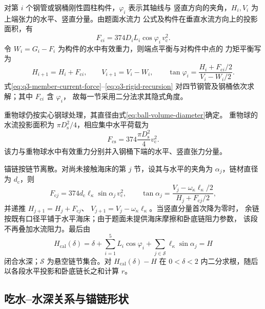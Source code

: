 对第 \(i\) 个钢管或钢桶刚性圆柱构件，\(\varphi_i\) 表示其轴线与
竖直方向的夹角，\(H_i,V_i\) 为上端张力的水平、竖直分量。由题面水流力
公式及构件在垂直水流方向上的投影面积，有
\begin{equation}
  F_{\mathrm{c}i}=374D_iL_i\cos\varphi_i\,v_{\mathrm c}^2.
  \label{eq:q3-member-current-force}
\end{equation}
令 \(W_i=G_i-F_i\) 为构件的水中有效重力，则端点平衡与对构件中点的
力矩平衡写为
\begin{equation}
  H_{i+1}=H_i+F_{\mathrm{c}i},
  \qquad V_{i+1}=V_i-W_i,
  \qquad
  \tan\varphi_i=
  \frac{H_i+F_{\mathrm{c}i}/2}{V_i-W_i/2}.
  \label{eq:q3-rigid-recursion}
\end{equation}
式\eqref{eq:q3-member-current-force}--\eqref{eq:q3-rigid-recursion}
对四节钢管及钢桶依次求解；其中 \(F_{\mathrm{c}i}\) 含 \(\varphi_i\)，
故每一节采用二分法求其隐式角度。

重物球仍按实心钢球处理，其直径由式\eqref{eq:ball-volume-diameter}确定。
重物球的水流投影面积为 \(\pi D_{\mathrm s}^2/4\)，相应集中水平荷载为
\begin{equation}
  F_{\mathrm{cs}}=374\frac{\pi D_{\mathrm s}^2}{4}v_{\mathrm c}^2.
  \label{eq:q3-ball-current-force}
\end{equation}
该力与重物球水中有效重力分别并入钢桶下端的水平、竖直张力分量。

锚链按链节离散。对尚未接触海床的第 \(j\) 节，设其与水平的夹角为
\(\alpha_j\)，链材直径为 \(d_{\mathrm c}\)，则
\begin{equation}
  F_{\mathrm{c}j}=374d_{\mathrm c}\ell_\kappa
  \sin\alpha_j\,v_{\mathrm c}^2,
  \qquad
  \tan\alpha_j=
  \frac{V_j-\omega_\kappa\ell_\kappa/2}
       {H_j+F_{\mathrm{c}j}/2},
  \label{eq:q3-chain-recursion}
\end{equation}
并递推 \(H_{j+1}=H_j+F_{\mathrm{c}j}\)、
\(V_{j+1}=V_j-\omega_\kappa\ell_\kappa\)。当竖直分量首次降为零时，
余链按既有口径平铺于水平海床；由于题面未提供海床摩擦和卧底链阻力参数，
该段不再叠加水流阻力。最后由
\begin{equation}
  H_{\mathrm{cal}}(\delta)=\delta+
  \sum_{i=1}^{5}L_i\cos\varphi_i+
  \sum_{j\in\mathcal S}\ell_\kappa\sin\alpha_j=H
  \label{eq:q3-depth-closure}
\end{equation}
闭合水深；\(\mathcal S\) 为悬空链节集合。对 \(H_{\mathrm{cal}}(\delta)-H\)
在 \(0<\delta<2\) 内二分求根，随后以各段水平投影和卧底链长之和计算 \(r\)。

\subsection{吃水--水深关系与锚链形状}

